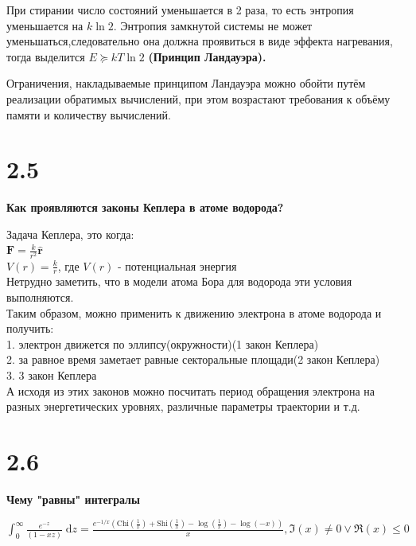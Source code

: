 \documentclass[a4paper,14pt]{article}
\begin{document}
При стирании число состояний уменьшается в 2 раза, то есть энтропия уменьшается на $k \ln 2$.
Энтропия замкнутой системы не может уменьшаться,следовательно она должна проявиться в виде эффекта нагревания, тогда выделится $E\succeq k T \ln 2$ \textbf{(Принцип Ландауэра).}

Ограничения, накладываемые принципом Ландауэра можно обойти путём реализации обратимых вычислений, при этом возрастают требования к объёму памяти и количеству вычислений.


\section*{2.5}

\begin{center}
	\LARGE{\textbf{Как проявляются законы Кеплера в атоме водорода?}}\\
\end{center}

Задача Кеплера, это когда:\\
$\mathbf {F} ={\frac {k}{r^{2}}}\mathbf {\hat {r}}$\\
$V(r)={\frac {k}{r}}$, где $V(r)$ - потенциальная энергия\\
Нетрудно заметить, что в модели атома Бора для водорода эти условия выполняются.\\
Таким образом, можно применить к движению электрона в атоме водорода и получить:\\
1. электрон движется по эллипсу(окружности)(1 закон Кеплера)\\
2. за равное время заметает равные секторальные площади(2 закон Кеплера)\\
3. 3 закон Кеплера\\
А исходя из этих законов можно посчитать период обращения электрона на разных энергетических уровнях, различные параметры траектории и т.д.\\

\section*{2.6}

\begin{center}
	\LARGE{\textbf{Чему "равны" интегралы}}\\
\end{center}

$\int_0^\infty \frac{e^{-z}}{(1 - x z)}\;\mathrm{d}z = \frac{e^{-1/x} \left(\text{Chi}\left(\frac{1}{x}\right)+\text{Shi}\left(\frac{1}{x}\right)-\log \left(\frac{1}{x}\right)-\log (-x)\right)}{x},\Im(x)\neq 0\lor \Re(x)\leq 0$\\
\end{document}
